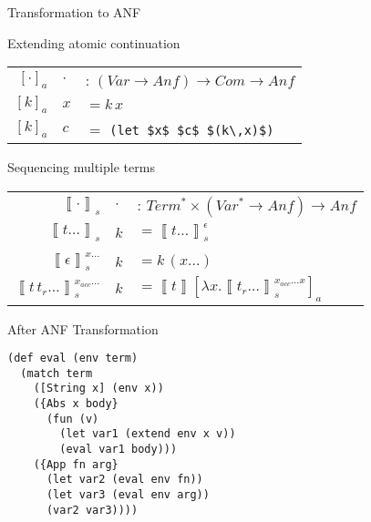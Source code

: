 \documentclass{beamer}
\newcommand{\bb}[1]{\left\llbracket #1 \right\rrbracket}
\newcommand{\anf}[2]{\bb{#1}#2}
\newcommand{\atomic}[1]{[ #1 ]_{a}}
\begin{document}
\begin{frame}[fragile]{Transformation to ANF}
  \begin{beamerboxesrounded}{Extending atomic continuation}
    \begin{center}
      \begingroup
      \setlength{\tabcolsep}{2pt}
      \begin{tabular}{rll}
        $[\cdot]_a$ & $\cdot$ & : $(Var \rightarrow Anf) \rightarrow Com \rightarrow Anf$\\
        $[k]_a$ & $x$ & $= k\,x$\\
        $[k]_a$ & $c$ & $= $ \lstinline!(let $x$ $c$ $(k\,x)$)!
      \end{tabular}
      \endgroup
      \end{center}
  \end{beamerboxesrounded}
  \vspace{\baselineskip}
  \begin{beamerboxesrounded}{Sequencing multiple terms}
    \begin{center}
      \begingroup
      \setlength{\tabcolsep}{2pt}
      \begin{tabular}{rll}
        $\bb{\cdot}_s$ & $\cdot$ &: $Term^* \times (Var^* \rightarrow Anf) \rightarrow Anf$\\
        $\bb{t\ldots}_s$ & $k$ & $= \bb{t\ldots}_s^{\epsilon}$\\
        \\
        $\bb{\epsilon}_s^{x\ldots}$ & $k$ & $= k\,(x\ldots)$\\
        $\bb{t\,t_r\ldots}_s^{x_{acc}\ldots}$ & $k$ & 
        $= \anf{t}{\atomic{\lambda x . \bb{t_r\ldots}_s^{x_{acc}\ldots x}}}$
      \end{tabular}
      \endgroup
      \end{center}
  \end{beamerboxesrounded}
\end{frame}

\begin{frame}[fragile]{After ANF Transformation}
  \begin{lstlisting}
(def eval (env term)
  (match term
    ([String x] (env x))
    ({Abs x body}
      (fun (v)
        (let var1 (extend env x v))
        (eval var1 body)))
    ({App fn arg}
      (let var2 (eval env fn))
      (let var3 (eval env arg))
      (var2 var3))))
  \end{lstlisting}
\end{frame}
\end{document}
